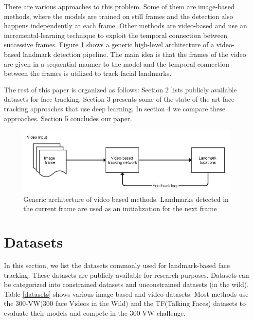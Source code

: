 \documentclass{llncs}
\begin{document}
	There are various approaches to this problem. Some of them are image-based methods, where the models are trained on still frames and the detection also happens independently at each frame. Other methods are video-based and use an incremental-learning technique to exploit the temporal connection between successive frames. Figure \ref{generic_video_based} shows a generic high-level architecture of a video-based landmark detection pipeline. The main idea is that the frames of the video are given in a sequential manner to the model and the temporal connection between the frames is utilized to track facial landmarks.
	
	The rest of this paper is organized as follows: Section 2 lists publicly available datasets for face tracking. Section 3 presents some of the state-of-the-art face tracking approaches that use deep learning. In section 4 we compare these approaches. Section 5 concludes our paper.
	
	\begin{figure}[h!]
		\centering
		\includegraphics[scale=0.5]{Media/generic_video_based}
		\vspace{-3mm}
		\caption{Generic architecture of video based methods. Landmarks detected in the current frame are used as an initialization for the next frame}
		\label{generic_video_based}
		\vspace{-3mm}
	\end{figure}
	
	\section{Datasets}
	
	In this section, we list the datasets commonly used for landmark-based face tracking. These datasets are publicly available for research purposes. Datasets can be categorized into constrained datasets and unconstrained datasets (in the wild).
	Table \ref{datasets} shows various image-based and video datasets. Most methods use the 300-VW(300 face Videos in the Wild)\cite{300-VW} and the TF(Talking Faces)\cite{tf} datasets to evaluate their models and compete in the 300-VW challenge.
	
\end{document}
